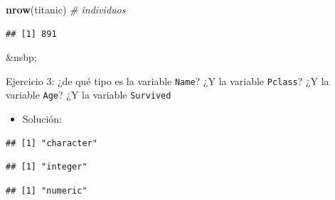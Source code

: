 \documentclass[11pt,]{book}
\newenvironment{Shaded}{\begin{snugshade}}{\end{snugshade}}
\newcommand{\CommentTok}[1]{\textcolor[rgb]{0.37,0.37,0.37}{\textit{#1}}}
\newcommand{\KeywordTok}[1]{\textcolor[rgb]{0.27,0.27,0.27}{\textbf{#1}}}
\newcommand{\NormalTok}[1]{#1}
\newcommand{\OperatorTok}[1]{\textcolor[rgb]{0.43,0.43,0.43}{\textbf{#1}}}
\providecommand{\tightlist}{%
  \setlength{\itemsep}{0pt}\setlength{\parskip}{0pt}}
\begin{document}
\begin{Shaded}
\begin{Highlighting}[]
\KeywordTok{nrow}\NormalTok{(titanic) }\CommentTok{# individuos}
\end{Highlighting}
\end{Shaded}

\begin{verbatim}
## [1] 891
\end{verbatim}

\&nsbp;

Ejercicio 3: ¿de qué tipo es la variable \texttt{Name}? ¿Y la variable \texttt{Pclass}? ¿Y la variable \texttt{Age}? ¿Y la variable \texttt{Survived}

\begin{itemize}
\tightlist
\item
  Solución:
\end{itemize}

\begin{Shaded}
\end{Shaded}

\begin{verbatim}
## [1] "character"
\end{verbatim}

\begin{Shaded}
\end{Shaded}

\begin{verbatim}
## [1] "integer"
\end{verbatim}

\begin{Shaded}
\end{Shaded}

\begin{verbatim}
## [1] "numeric"
\end{verbatim}

\begin{Shaded}
\end{Shaded}
\end{document}
